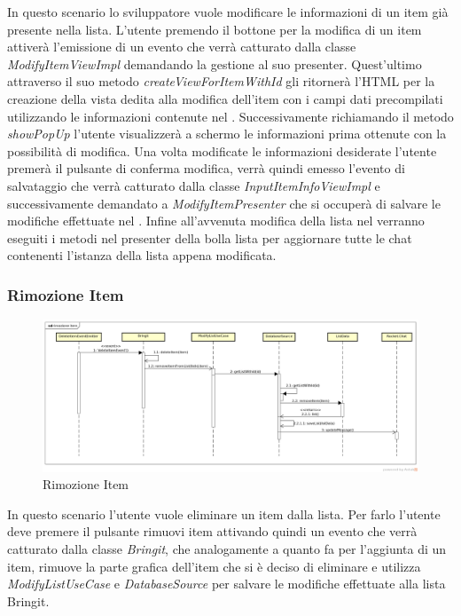 In questo scenario lo sviluppatore vuole modificare le informazioni di un item già presente nella lista. L'utente premendo il bottone per la modifica di un item attiverà l'emissione di un evento che verrà catturato dalla classe \textit{ModifyItemViewImpl} demandando la gestione al suo presenter. Quest'ultimo attraverso il suo metodo \textit{createViewForItemWithId} gli ritornerà l'HTML per la creazione della vista dedita alla modifica dell'item con i campi dati precompilati utilizzando le informazioni contenute nel . Successivamente richiamando il metodo \textit{showPopUp} l'utente visualizzerà a schermo le informazioni prima ottenute con la possibilità di modifica. Una volta modificate le informazioni desiderate l'utente premerà il pulsante di conferma modifica, verrà quindi emesso l'evento di salvataggio che verrà catturato dalla classe \textit{InputItemInfoViewImpl} e successivamente demandato a \textit{ModifyItemPresenter} che si occuperà di salvare le modifiche effettuate nel . Infine all'avvenuta modifica della lista nel  verranno eseguiti i metodi nel presenter della bolla lista per aggiornare tutte le chat contenenti l'istanza della lista appena modificata. 

\subsubsection{Rimozione Item}

\label{Rimozione Item }
\begin{figure}[H]
	\centering
	\includegraphics[width=\textwidth]{Sezioni/Diagrammi/App/rimozioneitem.png}
	\caption{Rimozione Item}
	
\end{figure}
In questo scenario l'utente vuole eliminare un item dalla lista. Per farlo l'utente deve premere il pulsante rimuovi item attivando quindi un evento che verrà catturato dalla classe \textit{Bringit}, che analogamente a quanto fa per l'aggiunta di un item, rimuove la parte grafica dell'item che si è deciso di eliminare e utilizza \textit{ModifyListUseCase} e \textit{DatabaseSource} per salvare le modifiche effettuate alla lista Bringit.


